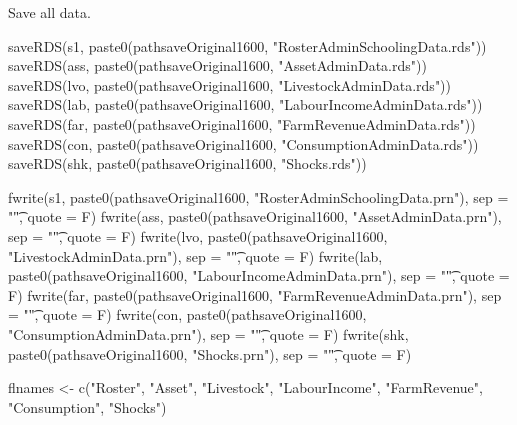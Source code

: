 Save all data.
\begin{Schunk}
\begin{Sinput}
saveRDS(s1, paste0(pathsaveOriginal1600, "RosterAdminSchoolingData.rds"))
saveRDS(ass, paste0(pathsaveOriginal1600, "AssetAdminData.rds"))
saveRDS(lvo, paste0(pathsaveOriginal1600, "LivestockAdminData.rds"))
saveRDS(lab, paste0(pathsaveOriginal1600, "LabourIncomeAdminData.rds"))
saveRDS(far, paste0(pathsaveOriginal1600, "FarmRevenueAdminData.rds"))
saveRDS(con, paste0(pathsaveOriginal1600, "ConsumptionAdminData.rds"))
saveRDS(shk, paste0(pathsaveOriginal1600, "Shocks.rds"))
\end{Sinput}
\end{Schunk}
\begin{Schunk}
\begin{Sinput}
fwrite(s1, paste0(pathsaveOriginal1600, "RosterAdminSchoolingData.prn"), sep = "\t", quote = F)
fwrite(ass, paste0(pathsaveOriginal1600, "AssetAdminData.prn"), sep = "\t", quote = F)
fwrite(lvo, paste0(pathsaveOriginal1600, "LivestockAdminData.prn"), sep = "\t", quote = F)
fwrite(lab, paste0(pathsaveOriginal1600, "LabourIncomeAdminData.prn"), sep = "\t", quote = F)
fwrite(far, paste0(pathsaveOriginal1600, "FarmRevenueAdminData.prn"), sep = "\t", quote = F)
fwrite(con, paste0(pathsaveOriginal1600, "ConsumptionAdminData.prn"), sep = "\t", quote = F)
fwrite(shk, paste0(pathsaveOriginal1600, "Shocks.prn"), sep = "\t", quote = F)
\end{Sinput}
\end{Schunk}
\begin{Schunk}
\begin{Sinput}
flnames <- c("Roster", "Asset", "Livestock", "LabourIncome", "FarmRevenue", "Consumption", "Shocks")
\end{Sinput}
\end{Schunk}



